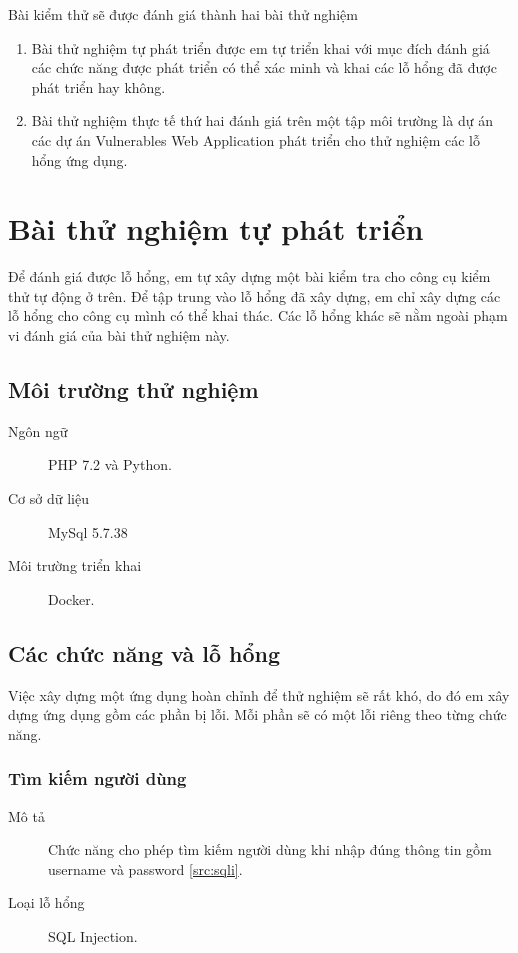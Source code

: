\documentclass[./../main.tex]{subfiles}
\begin{document}
Bài kiểm thử sẽ được đánh giá thành hai bài thử nghiệm
\begin{enumerate}
	\item Bài thử nghiệm tự phát triển được em tự triển khai với mục đích đánh
	      giá các chức năng được phát triển có thể xác minh và khai các lỗ hổng
	      đã được phát triển hay không.
	\item Bài thử nghiệm thực tế thứ hai đánh giá trên một tập môi trường là dự án các dự án Vulnerables Web Application phát triển cho thử nghiệm các lỗ hổng ứng dụng.
\end{enumerate}

\section{Bài thử nghiệm tự phát triển}

Để đánh giá được lỗ hổng, em tự xây dựng một bài kiểm tra cho công cụ kiểm thử tự động ở trên. Để tập trung vào lỗ hổng đã xây dựng, em chỉ xây dựng các lỗ hổng cho công cụ mình có thể khai thác. Các lỗ hổng khác sẽ nằm ngoài phạm vi đánh giá của bài thử nghiệm này.

\subsection{Môi trường thử nghiệm}

\begin{description}
	\item[Ngôn ngữ] PHP 7.2 và Python.
	\item [Cơ sở dữ liệu] MySql 5.7.38
	\item [Môi trường triển khai] Docker.
\end{description}

\subsection{Các chức năng và lỗ hổng}

Việc xây dựng một ứng dụng hoàn chỉnh để thử nghiệm sẽ rất khó,
do đó em xây dựng ứng dụng gồm các phần bị lỗi. Mỗi phần sẽ có một lỗi riêng
theo từng chức năng.

\subsubsection{Tìm kiếm người dùng}

\begin{description}
	\item[Mô tả] Chức năng cho phép tìm kiếm người dùng khi nhập đúng
	      thông tin gồm username và password \ref{src:sqli}.
	\item [Loại lỗ hổng] SQL Injection.
\end{description}
\end{document}
